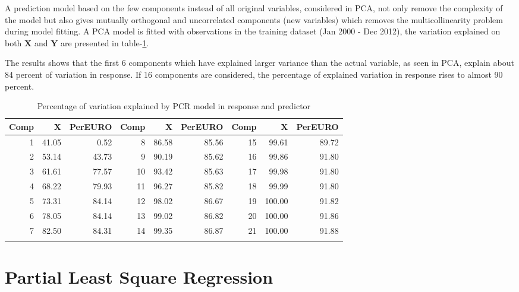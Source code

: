 \documentclass[12pt, lot, lof]{thesis}\usepackage[]{graphicx}\usepackage[]{color}
\newcommand{\mbf}[1]{\ensuremath{\mathbf{#1}}}
\begin{document}
A prediction model based on the few components instead of all original variables, considered in PCA, not only remove the complexity of the model but also gives mutually orthogonal and uncorrelated components (new variables) which removes the multicollinearity problem during model fitting. A PCA model is fitted with observations in the training dataset (Jan 2000 - Dec 2012), the variation explained on both \mbf{X} and \mbf{Y} are presented in table-\ref{tbl:pcrSumry}.

The results shows that the first 6 components which have explained larger variance than the actual variable, as seen in PCA, explain about 84 percent of variation in response. If 16 components are considered, the percentage of explained variation in response rises to almost 90 percent.

{\singlespacing\sffamily
{\footnotesize
\begin{longtable}{rrr|rrr|rrr}
\caption{Percentage of variation explained by PCR model in response and predictor} \\ 
  \hline
Comp & X & PerEURO & Comp & X & PerEURO & Comp & X & PerEURO \\ 
  \hline
  1 & 41.05 & 0.52 &   8 & 86.58 & 85.56 &  15 & 99.61 & 89.72 \\ 
    2 & 53.14 & 43.73 &   9 & 90.19 & 85.62 &  16 & 99.86 & 91.80 \\ 
    3 & 61.61 & 77.57 &  10 & 93.42 & 85.63 &  17 & 99.98 & 91.80 \\ 
    4 & 68.22 & 79.93 &  11 & 96.27 & 85.82 &  18 & 99.99 & 91.80 \\ 
    5 & 73.31 & 84.14 &  12 & 98.02 & 86.67 &  19 & 100.00 & 91.82 \\ 
    6 & 78.05 & 84.14 &  13 & 99.02 & 86.82 &  20 & 100.00 & 91.86 \\ 
    7 & 82.50 & 84.31 &  14 & 99.35 & 86.87 &  21 & 100.00 & 91.88 \\ 
   \hline
\hline
\label{tbl:pcrSumry}
\end{longtable}
}

}
  

\section{Partial Least Square Regression}
\label{sec:plsAnalysis}
\end{document}
